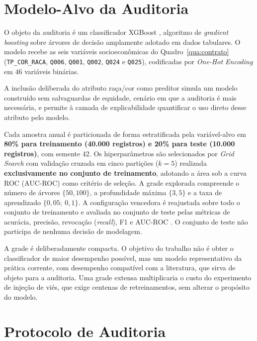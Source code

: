 \section{Modelo-Alvo da Auditoria}
\label{sec:modelo}

O objeto da auditoria é um classificador XGBoost \cite{chen2016xgboost}, algoritmo de \textit{gradient boosting} sobre árvores de decisão amplamente adotado em dados tabulares. O modelo recebe as seis variáveis socioeconômicas do Quadro~\ref{qua:contrato} (\texttt{TP\_COR\_RACA}, \texttt{Q006}, \texttt{Q001}, \texttt{Q002}, \texttt{Q024} e \texttt{Q025}), codificadas por \textit{One-Hot Encoding} em 46 variáveis binárias.

A inclusão deliberada do atributo raça/cor como preditor simula um modelo construído sem salvaguardas de equidade, cenário em que a auditoria é mais necessária, e permite à camada de explicabilidade quantificar o uso direto desse atributo pelo modelo.

Cada amostra anual é particionada de forma estratificada pela variável-alvo em \textbf{80\% para treinamento (40.000 registros) e 20\% para teste (10.000 registros)}, com semente 42. Os hiperparâmetros são selecionados por \textit{Grid Search} com validação cruzada em cinco partições ($k=5$) realizada \textbf{exclusivamente no conjunto de treinamento}, adotando a área sob a curva ROC (AUC-ROC) como critério de seleção. A grade explorada compreende o número de árvores $\{50, 100\}$, a profundidade máxima $\{3, 5\}$ e a taxa de aprendizado $\{0{,}05;\ 0{,}1\}$. A configuração vencedora é reajustada sobre todo o conjunto de treinamento e avaliada no conjunto de teste pelas métricas de acurácia, precisão, revocação (\textit{recall}), F1 e AUC-ROC \cite{hastie2009elements}. O conjunto de teste não participa de nenhuma decisão de modelagem.

A grade é deliberadamente compacta. O objetivo do trabalho não é obter o classificador de maior desempenho possível, mas um modelo representativo da prática corrente, com desempenho compatível com a literatura, que sirva de objeto para a auditoria. Uma grade extensa multiplicaria o custo do experimento de injeção de viés, que exige centenas de retreinamentos, sem alterar o propósito do modelo.

\section{Protocolo de Auditoria}
\label{sec:auditoria}


